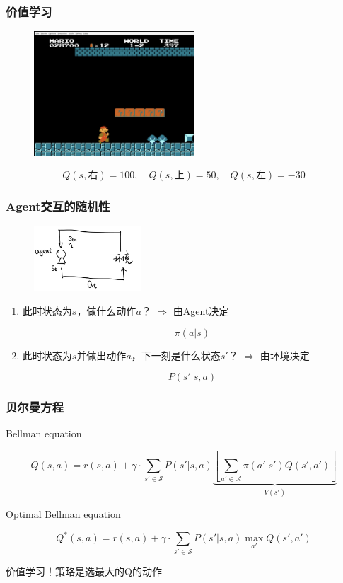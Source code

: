 \documentclass[9pt]{beamer}
\begin{document}
\begin{frame}
\frametitle{价值学习}

\begin{figure}
\includegraphics[width=6cm]{../fig/mario.png}
\end{figure}

\[
Q(s,\text{右})=100,\quad Q(s,\text{上})=50, \quad Q(s,\text{左})=-30
\]


\end{frame}

\begin{frame}
\frametitle{Agent交互的随机性}

\begin{figure}
\includegraphics[width=4cm]{../fig/agent.jpg}
\end{figure}

\begin{enumerate}
\item 此时状态为$s$，做什么动作$a$？ $\Rightarrow$ 由Agent决定

\[
\pi(a|s)
\]

\item 此时状态为$s$并做出动作$a$，下一刻是什么状态$s'$？ $\Rightarrow$ 由环境决定

\[
P(s'|s,a)
\]
\end{enumerate}

\end{frame}

\begin{frame}
\frametitle{贝尔曼方程}

Bellman equation

\[
Q(s,a)=r(s,a)+\gamma\cdot \sum_{s'\in \mathcal{S}}P(s'|s,a)\underbrace{\left[\sum_{a'\in \mathcal{A}}\pi(a'|s')Q(s',a') \right]}_{V(s')}
\]

Optimal Bellman equation

\vspace{1em}

\[
Q^*(s,a)=r(s,a)+\gamma\cdot \sum_{s'\in \mathcal{S}}P(s'|s,a)\max_{a'}Q(s',a')
\]

\pause

\vspace{1em}

价值学习！策略是选最大的Q的动作

\end{frame}
\end{document}
